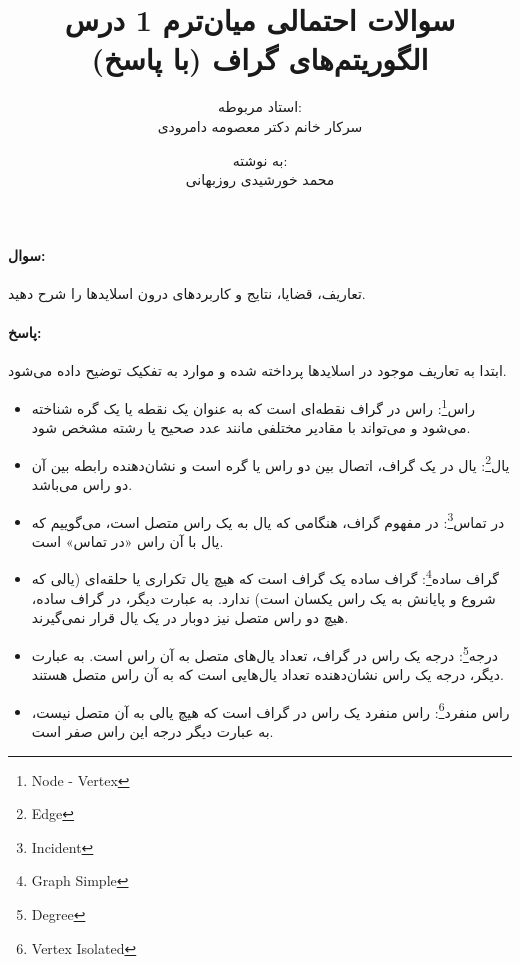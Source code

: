 \documentclass[a4paper,10pt]{article}
\title{سوالات احتمالی میان‌ترم 1 درس الگوریتم‌های گراف (با پاسخ)}
\author{استاد مربوطه:\\سرکار خانم دکتر معصومه دامرودی \and به نوشته:\\محمد خورشیدی روزبهانی}
\date{}
\begin{document}
    \maketitle

    \paragraph{سوال:} تعاریف، قضایا، نتایج و کاربردهای درون اسلایدها را شرح دهید.

    \paragraph{پاسخ:} ابتدا به تعاریف موجود در اسلایدها پرداخته شده و موارد به تفکیک توضیح داده می‌شود.

    \begin{itemize}
        
        \item راس\footnote{\hspace{2pt}Node - Vertex}: راس در گراف نقطه‌ای است که به عنوان یک نقطه یا یک گره شناخته می‌شود و می‌تواند با مقادیر مختلفی مانند عدد صحیح یا رشته مشخص شود.
        
        \item یال\footnote{\hspace{2pt}Edge}: یال در یک گراف، اتصال بین دو راس یا گره است و نشان‌دهنده رابطه بین آن دو راس می‌باشد.
        
        \item در تماس\footnote{\hspace{2pt}Incident}: در مفهوم گراف، هنگامی که یال به یک راس متصل است، می‌گوییم که یال با آن راس «در تماس» است.

        \item گراف ساده\footnote{\hspace{2pt}Graph Simple}: گراف ساده یک گراف است که هیچ یال تکراری یا حلقه‌ای (یالی که شروع و پایانش به یک راس یکسان است) ندارد. به عبارت دیگر، در گراف ساده، هیچ دو راس متصل نیز دوبار در یک یال قرار نمی‌گیرند.
        
        \item درجه\footnote{\hspace{2pt}Degree}: درجه یک راس در گراف، تعداد یال‌های متصل به آن راس است. به عبارت دیگر، درجه یک راس نشان‌دهنده تعداد یال‌هایی است که به آن راس متصل هستند.
        
        \item راس منفرد\footnote{\hspace{2pt}Vertex Isolated}: راس منفرد یک راس در گراف است که هیچ یالی به آن متصل نیست، به عبارت دیگر درجه این راس صفر است.
        

\end{itemize}
\end{document}
